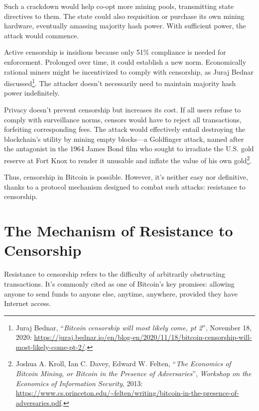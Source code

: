 \documentclass[
  a5paper,
  smalldemyvopaper,10pt,twoside,onecolumn,openright,extrafontsizes,hidelinks]{memoir}
\begin{document}
Such a crackdown would help co-opt more mining pools, transmitting state
directives to them. The state could also requisition or purchase its own
mining hardware, eventually amassing majority hash power. With
sufficient power, the attack would commence.

Active censorship is insidious because only 51\% compliance is needed
for enforcement. Prolonged over time, it could establish a new norm.
Economically rational miners might be incentivized to comply with
censorship, as Juraj Bednar discussed\footnote{Juraj Bednar,
  ``\emph{Bitcoin censorship will most likely come, pt 2}'', November
  18, 2020:
  \url{https://juraj.bednar.io/en/blog-en/2020/11/18/bitcoin-censorship-will-most-likely-come-pt-2/}.}.
The attacker doesn't necessarily need to maintain majority hash power
indefinitely.

Privacy doesn't prevent censorship but increases its cost. If all users
refuse to comply with surveillance norms, censors would have to reject
all transactions, forfeiting corresponding fees. The attack would
effectively entail destroying the blockchain's utility by mining empty
blocks---a Goldfinger attack, named after the antagonist in the 1964
James Bond film who sought to irradiate the U.S. gold reserve at Fort
Knox to render it unusable and inflate the value of his own
gold\footnote{Joshua A. Kroll, Ian C. Davey, Edward W. Felten,
  ``\emph{The Economics of Bitcoin Mining, or Bitcoin in the Presence of
  Adversaries}'', \emph{Workshop on the Economics of Information
  Security}, 2013:
  \url{https://www.cs.princeton.edu/~felten/writing/bitcoin-in-the-presence-of-adversaries.pdf}.}.

Thus, censorship in Bitcoin is possible. However, it's neither easy nor
definitive, thanks to a protocol mechanism designed to combat such
attacks: resistance to censorship.

\section*{The Mechanism of Resistance to
Censorship}\label{le-muxe9canisme-de-ruxe9sistance-uxe0-la-censure}


Resistance to censorship refers to the difficulty of arbitrarily
obstructing transactions. It's commonly cited as one of Bitcoin's key
promises: allowing anyone to send funds to anyone else, anytime,
anywhere, provided they have Internet access.
\end{document}
